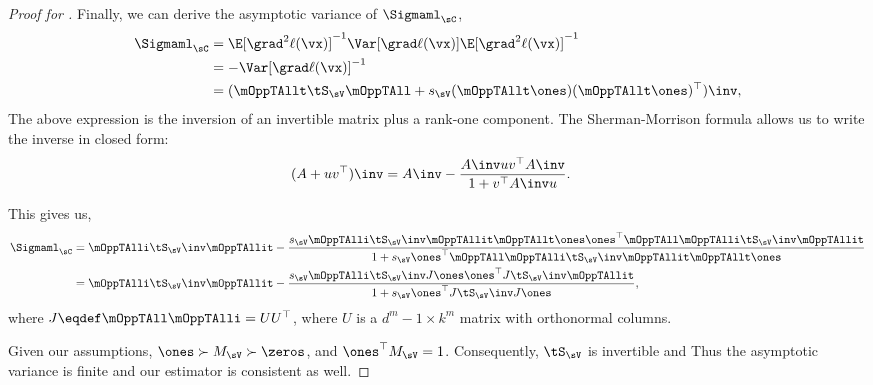 \begin{proof}[Proof for ]
Finally, we can derive the asymptotic variance of $\Sigmaml_\sC$,
\begin{align*}
    \Sigmaml_{\sC} 
      &= \E[\grad^2 \ell(\vx)]^{-1} \Var [\grad \ell(\vx)] \E[\grad^2 \ell(\vx)]^{-1} \\
      &= -\Var[\grad \ell(\vx)]^{-1} \\
      &= (\mOppTAllt \tS_\sV \mOppTAll + s_\sV (\mOppTAllt \ones)(\mOppTAllt \ones)^\top)\inv,
\end{align*}
The above expression is the inversion of an invertible matrix plus a rank-one component. The Sherman-Morrison formula allows us to write the inverse in closed form:
\begin{align*}
  (A + uv^\top)\inv &= A\inv - \frac{A\inv uv^\top A\inv}{1 + v^\top A\inv u}.
\end{align*}

This gives us,
\begin{align}
    \Sigmaml_{\sC} 
    &= \mOppTAlli \tS_\sV\inv \mOppTAllit 
      - \frac{s_\sV \mOppTAlli \tS_\sV\inv \mOppTAllit \mOppTAllt \ones \ones^\top \mOppTAll \mOppTAlli \tS_\sV\inv \mOppTAllit }
      {1 + s_\sV \ones^\top \mOppTAll \mOppTAlli \tS_\sV\inv \mOppTAllit \mOppTAllt \ones} \nonumber \\
    &= \mOppTAlli \tS_\sV\inv \mOppTAllit 
      - \frac{s_\sV \mOppTAlli \tS_\sV\inv J \ones \ones^\top J \tS_\sV\inv \mOppTAllit }
      {1 + s_\sV \ones^\top J \tS_\sV\inv J \ones}, \label{eqn:asymp-var-ml}
\end{align}
where $J \eqdef \mOppTAll \mOppTAlli = U U^\top$, where $U$ is a $d^m
- 1 \times k^m$ matrix with orthonormal columns.

Given our assumptions, $\ones \succ M_\sV \succ \zeros$, and
  $\ones^\top M_\sV = 1$. Consequently, $\tS_\sV$ is invertible and 
Thus the asymptotic variance is finite and our estimator is consistent
  as well. 
\end{proof}

